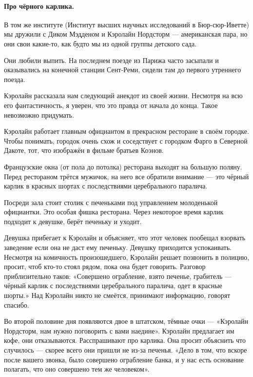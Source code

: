 \documentclass{book}
\begin{document}
\paragraph{Про чёрного карлика.}
В том же институте (Институт высших научных исследований в Бюр-сюр-Иветте) мы дружили с  
Диком Мэдденом и Кэролайн Нордсторм --- американская пара, но они свои какие-то, как будто мы из одной группы детского сада.

Они любили выпить.
На последнем поезде из Парижа часто засыпали и оказывались на конечной станции Сент-Реми, сидели там до первого утреннего поезда.

{\sloppy

Кэролайн рассказала нам следующий анекдот из своей жизни.
Несмотря на всю его фантастичность, я уверен, что это правда от начала до конца.
Такое невозможно придумать.

}

Кэролайн работает главным официантом в прекрасном ресторане в своём городке.
Чтобы понимать, городок очень схож и соседствует с городком Фарго в Северной Дакоте, тот, что изображён в фильме братьев Коэнов.

Французские окна (от пола до потолка) ресторана выходят на большую поляну.
Перед рестораном трётся мужичок, на него все обратили внимание --- это чёрный карлик в красных шортах с последствиями церебрального паралича.

Посреди зала стоит столик с печеньками под управлением молоденькой официантки.
Это особая фишка ресторана.
Через некоторое время карлик подходит к девушке, берёт печеньку и уходит.

Девушка прибегает к Кэролайн и объясняет, что этот человек пообещал взорвать заведение если она не даст ему печеньку.
Девушку приходится успокаивать.
Несмотря на комичность произошедшего, Кэролайн решает позвонить в полицию, просит, чтоб кто-то стоял рядом, пока она будет говорить.
Разговор приблизительно таков:
«Совершено ограбление, взято печенье, грабитель --- чёрный карлик с последствиями церебрального паралича, одет в красные шорты.»
Над Кэролайн никто не смеётся, принимают информацию, говорят спасибо.

Во второй половине дня появляются двое в штатском, тёмные очки --- «Кэролайн Нордсторм, нам нужно поговорить с вами наедине».
Кэролайн предлагает им кофе, они отказываются.
Расспрашивают про карлика.
Она просит объяснить что случилось --- скорее всего они пришли не из-за печенья.
«Дело в том, что вскоре после вашего звонка, было совершено ограбление банка, и у нас есть основание полагать, что оно совершено тем же человеком».
\end{document}
